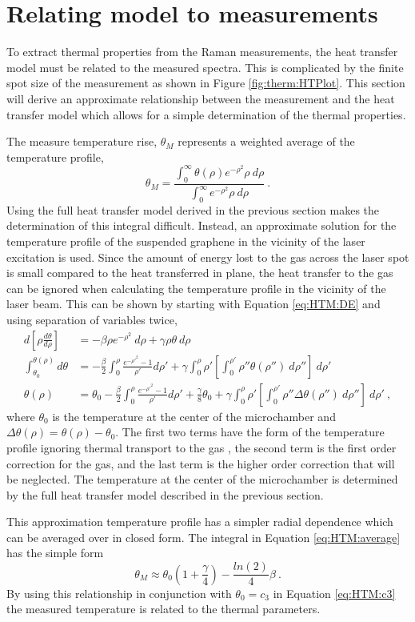 \section{Relating model to measurements}
To extract thermal properties from the Raman measurements, the heat transfer model must be related to the measured spectra.
This is complicated by the finite spot size of the measurement as shown in Figure \ref{fig:therm:HTPlot}.
This section will derive an approximate relationship between the measurement and the heat transfer model which allows for a simple determination of the thermal properties.

The measure temperature rise, $\theta_M$ represents a weighted average of the temperature profile,
\begin{equation}
	\theta_M=\frac{\int_0^{\infty} \theta(\rho) e^{-\rho^2} \rho \ d \rho}{\int_0^{\infty} e^{-\rho^2} \rho \ d \rho} \ . \label{eq:HTM:average}
\end{equation}
Using the full heat transfer model derived in the previous section makes the determination of this integral difficult.
Instead, an approximate solution for the temperature profile of the suspended graphene in the vicinity of the laser excitation is used.
Since the amount of energy lost to the gas across the laser spot is small compared to the heat transferred in plane, the heat transfer to the gas can be ignored when calculating the temperature profile in the vicinity of the laser beam.
This can be shown by starting with Equation \ref{eq:HTM:DE} and using separation of variables twice,
\begin{align*}
	d \left[\rho \frac{d \theta}{d \rho} \right]&=-\beta \rho e^{-\rho^2} \ d \rho+\gamma \rho \theta \ d \rho \\
	\int_{\theta_0}^{\theta(\rho)} d \theta&=
		-\frac{\beta}{2} \int_0^{\rho}\frac{e^{-\rho'^2}-1}{\rho'} d \rho' + 
		\gamma \int_0^{\rho}\rho' \left[\int_{0}^{\rho'}\rho'' \theta(\rho'') \ d \rho''\right] \ d \rho' \\
	\theta(\rho)&=\theta_0-\frac{\beta}{2} \int_0^{\rho}\frac{e^{-\rho'^2}-1}{\rho'} d \rho'+
		\frac{\gamma}{8} \theta_0 +
		\gamma \int_0^{\rho}\rho' \left[\int_{0}^{\rho'}\rho'' \Delta \theta(\rho'') \ d \rho''\right] \ d \rho' \ ,
\end{align*}
where $\theta_0$ is the temperature at the center of the microchamber and $\Delta \theta(\rho)=\theta(\rho)-\theta_0$.
The first two terms have the form of the temperature profile ignoring thermal transport to the gas \cite{Faugeras2010}, the second term is the first order correction for the gas, and the last term is the higher order correction that will be neglected.
The temperature at the center of the microchamber is determined by the full heat transfer model described in the previous section.

This approximation temperature profile has a simpler radial dependence which can be averaged over in closed form.
The integral in Equation \ref{eq:HTM:average} has the simple form
\begin{equation}
	\theta_M \approx \theta_0(1+\frac{\gamma}{4})-\frac{ln(2)}{4} \beta \ .
\end{equation}
By using this relationship in conjunction with $\theta_0=c_3$ in Equation \ref{eq:HTM:c3} the measured temperature is related to the thermal parameters.